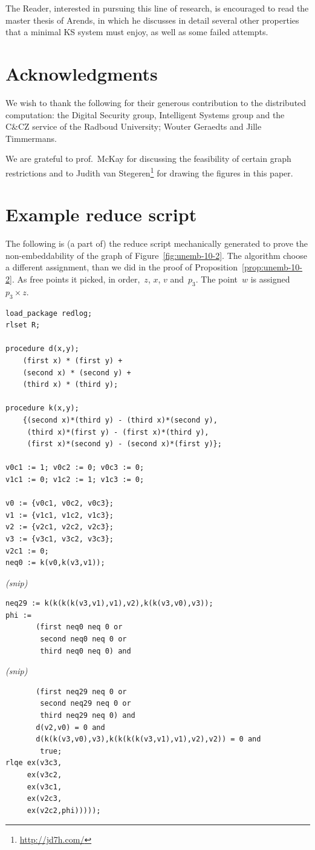 \documentclass[adraft,copyright,creativecommons]{eptcs}
\newcounter{main}
\theoremstyle{definition}
\theoremstyle{remark}
\begin{document}
The Reader, interested in pursuing this line of research,
is encouraged to read the master thesis\cite{a09} of Arends,
in which he discusses in detail several other
properties that a minimal KS system must enjoy, as well as
some failed attempts.

\section{Acknowledgments}
We wish to thank the following for their generous contribution to the
distributed computation:
    the Digital Security group, Intelligent Systems group
    and the C\&CZ service of the Radboud University;
    Wouter Geraedts and
    Jille Timmermans.

We are grateful to prof.~McKay for discussing
the feasibility of certain graph restrictions and
to Judith van Stegeren\footnote{\url{http://jd7h.com/}}
for drawing the figures in this paper.

\clearpage
\appendix
\section{Example reduce script}\label{adx:unemb-10-2}
The following is (a part of) the reduce script mechanically generated
to prove the non-embeddability of the graph of Figure~\ref{fig:unemb-10-2}.
The algorithm choose a different assignment, than we did in the
proof of Proposition~\ref{prop:unemb-10-2}.
As free points it picked, in order,~$z$, $x$, $v$ and~$p_3$.
The point~$w$ is assigned~$p_3 \times z$.
\begin{verbatim}
load_package redlog;
rlset R;

procedure d(x,y);
    (first x) * (first y) +
    (second x) * (second y) +
    (third x) * (third y);

procedure k(x,y);
    {(second x)*(third y) - (third x)*(second y),
     (third x)*(first y) - (first x)*(third y),
     (first x)*(second y) - (second x)*(first y)};

v0c1 := 1; v0c2 := 0; v0c3 := 0;
v1c1 := 0; v1c2 := 1; v1c3 := 0;

v0 := {v0c1, v0c2, v0c3}; 
v1 := {v1c1, v1c2, v1c3}; 
v2 := {v2c1, v2c2, v2c3}; 
v3 := {v3c1, v3c2, v3c3}; 
v2c1 := 0;
neq0 := k(v0,k(v3,v1)); 
\end{verbatim}
\begin{center} \emph{(snip)} \end{center}
\begin{verbatim}
neq29 := k(k(k(k(v3,v1),v1),v2),k(k(v3,v0),v3)); 
phi := 
       (first neq0 neq 0 or
        second neq0 neq 0 or
        third neq0 neq 0) and 
\end{verbatim}
\begin{center} \emph{(snip)} \end{center}
\begin{verbatim}
       (first neq29 neq 0 or
        second neq29 neq 0 or
        third neq29 neq 0) and 
       d(v2,v0) = 0 and 
       d(k(k(v3,v0),v3),k(k(k(k(v3,v1),v1),v2),v2)) = 0 and 
        true;
rlqe ex(v3c3,
     ex(v3c2,
     ex(v3c1,
     ex(v2c3,
     ex(v2c2,phi)))));
\end{verbatim}


\clearpage
{}

\end{document}

